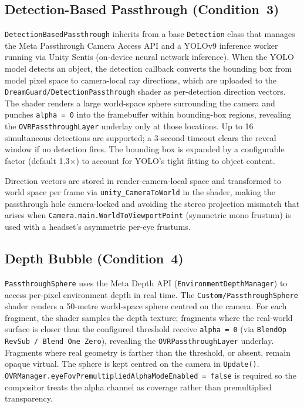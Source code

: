 \documentclass{styling/vgtc} %
\begin{document}
\subsection{Detection-Based Passthrough (Condition~3)}

\texttt{DetectionBasedPassthrough} inherits from a base
\texttt{Detection} class that manages the Meta Passthrough Camera Access
API and a YOLOv9 inference worker running via Unity Sentis (on-device
neural network inference). When the YOLO model detects an object, the
detection callback converts the bounding box from model pixel space to
camera-local ray directions, which are uploaded to the
\texttt{DreamGuard/DetectionPassthrough} shader as per-detection
direction vectors. The shader renders a large world-space sphere
surrounding the camera and punches \texttt{alpha\,=\,0} into the
framebuffer within bounding-box regions, revealing the
\texttt{OVRPassthroughLayer} underlay only at those locations. Up to 16
simultaneous detections are supported; a 3-second timeout clears the
reveal window if no detection fires. The bounding box is expanded by a
configurable factor (default 1.3$\times$) to account for YOLO's tight
fitting to object content.

Direction vectors are stored in render-camera-local space and
transformed to world space per frame via \texttt{unity\_CameraToWorld}
in the shader, making the passthrough hole camera-locked and avoiding
the stereo projection mismatch that arises when \texttt{Camera.main\allowbreak{}.WorldToViewportPoint}
(symmetric mono frustum) is used with a headset's asymmetric per-eye
frustums.

\subsection{Depth Bubble (Condition~4)}

\texttt{PassthroughSphere} uses the Meta Depth API
(\texttt{EnvironmentDepthManager}) to access per-pixel environment depth
in real time. The \texttt{Custom/PassthroughSphere} shader renders a
50-metre world-space sphere centred on the camera. For each fragment,
the shader samples the depth texture; fragments where the real-world
surface is closer than the configured threshold receive
\texttt{alpha\,=\,0} (via \texttt{BlendOp RevSub / Blend One Zero}),
revealing the \texttt{OVRPassthroughLayer} underlay. Fragments where
real geometry is farther than the threshold, or absent, remain opaque
virtual. The sphere is kept centred on the camera in \texttt{Update()}.
\texttt{OVRManager.eyeFovPremultipliedAlphaModeEnabled\,=\,false} is
required so the compositor treats the alpha channel as coverage rather
than premultiplied transparency.
\end{document}
